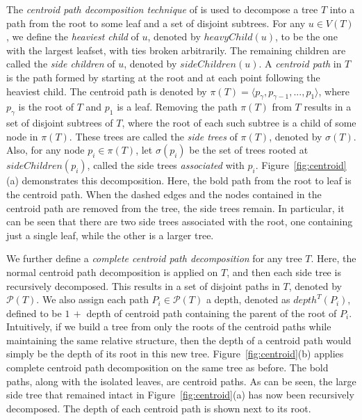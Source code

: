 \documentclass{article}
\begin{document}
    The \textit{centroid path decomposition technique} of \cite{cole2000n} is used to decompose a tree $T$ into a path from the root to some leaf and a set of disjoint subtrees. For any $u \in V(T)$, we define the \textit{heaviest child} of $u$, denoted by $heavyChild(u)$, to be the one with the largest leafset, with ties broken arbitrarily. The remaining children are called the \textit{side children} of $u$, denoted by $sideChildren(u)$. A \textit{centroid path} in $T$ is the path formed by starting at the root and at each point following the heaviest child. The centroid path is denoted by $\pi(T) = \langle p_{\gamma}, p_{\gamma - 1}, ..., p_1 \rangle$, where $p_{\gamma}$ is the root of $T$ and $p_1$ is a leaf. Removing the path $\pi(T)$ from $T$ results in a set of disjoint subtrees of $T$, where the root of each such subtree is a child of some node in $\pi(T)$. These trees are called the \textit{side trees} of $\pi(T)$, denoted by $\sigma(T)$. Also, for any node $p_i \in \pi(T)$, let $\sigma(p_i)$ be the set of trees rooted at $sideChildren(p_i)$, called the side trees \textit{associated} with $p_i$. Figure~\ref{fig:centroid}(a) demonstrates this decomposition. Here, the bold path from the root to leaf is the centroid path. When the dashed edges and the nodes contained in the centroid path are removed from the tree, the side trees remain. In particular, it can be seen that there are two side trees associated with the root, one containing just a single leaf, while the other is a larger tree.

    We further define a \textit{complete centroid path decomposition} for any tree $T$. Here, the normal centroid path decomposition is applied on $T$, and then each side tree is recursively decomposed. This results in a set of disjoint paths in $T$, denoted by $\mathcal{P}(T)$. We also assign each path $P_i \in \mathcal{P}(T)$ a depth, denoted as $depth^{T}(P_i)$, defined to be $1\, +$ depth of centroid path containing the parent of the root of $P_i$. Intuitively, if we build a tree from only the roots of the centroid paths while maintaining the same relative structure, then the depth of a centroid path would simply be the depth of its root in this new tree. Figure~\ref{fig:centroid}(b) applies complete centroid path decomposition on the same tree as before. The bold paths, along with the isolated leaves, are centroid paths. As can be seen, the large side tree that remained intact in Figure~\ref{fig:centroid}(a) has now been recursively decomposed. The depth of each centroid path is shown next to its root.
\end{document}
